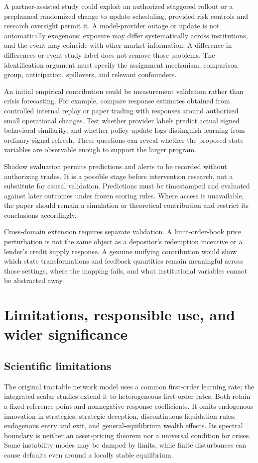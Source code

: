 \documentclass[11pt,a4paper]{article}
\theoremstyle{definition}
\theoremstyle{remark}
\begin{document}
A partner-assisted study could exploit an authorized staggered rollout or a preplanned randomized change to update scheduling, provided risk controls and research oversight permit it. A model-provider outage or update is not automatically exogenous: exposure may differ systematically across institutions, and the event may coincide with other market information. A difference-in-differences or event-study label does not remove those problems. The identification argument must specify the assignment mechanism, comparison group, anticipation, spillovers, and relevant confounders.

An initial empirical contribution could be measurement validation rather than crisis forecasting. For example, compare response estimates obtained from controlled internal replay or paper trading with responses around authorized small operational changes. Test whether provider labels predict actual signed behavioral similarity, and whether policy update logs distinguish learning from ordinary signal refresh. These questions can reveal whether the proposed state variables are observable enough to support the larger program.

Shadow evaluation permits predictions and alerts to be recorded without authorizing trades. It is a possible stage before intervention research, not a substitute for causal validation. Predictions must be timestamped and evaluated against later outcomes under frozen scoring rules. Where access is unavailable, the paper should remain a simulation or theoretical contribution and restrict its conclusions accordingly.

Cross-domain extension requires separate validation. A limit-order-book price perturbation is not the same object as a depositor's redemption incentive or a lender's credit supply response. A genuine unifying contribution would show which state transformations and feedback quantities remain meaningful across those settings, where the mapping fails, and what institutional variables cannot be abstracted away.

\section{Limitations, responsible use, and wider significance}
\label{sec:limits}
\subsection{Scientific limitations}
The original tractable network model uses a common first-order learning rate; the integrated scalar studies extend it to heterogeneous first-order rates. Both retain a fixed reference point and nonnegative response coefficients. It omits endogenous innovation in strategies, strategic deception, discontinuous liquidation rules, endogenous entry and exit, and general-equilibrium wealth effects. Its spectral boundary is neither an asset-pricing theorem nor a universal condition for crises. Some instability modes may be damped by limits, while finite disturbances can cause defaults even around a locally stable equilibrium.
\end{document}
